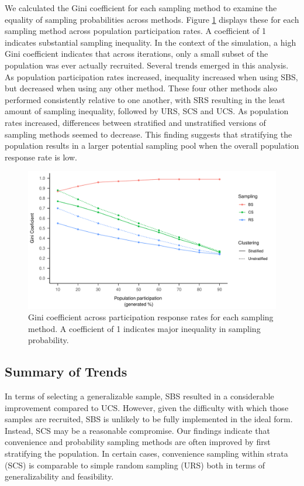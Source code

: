\documentclass[english,man,floatsintext]{apa6}
\begin{document}
We calculated the Gini coefficient for each sampling method to examine the equality of sampling probabilities across methods. Figure \ref{fig:fig-gini} displays these for each sampling method across population participation rates. A coefficient of 1 indicates substantial sampling inequality. In the context of the simulation, a high Gini coefficient indicates that across iterations, only a small subset of the population was ever actually recruited.
Several trends emerged in this analysis. As population participation rates increased, inequality increased when using SBS, but decreased when using any other method. These four other methods also performed consistently relative to one another, with SRS resulting in the least amount of sampling inequality, followed by URS, SCS and UCS. As population rates increased, differences between stratified and unstratified versions of sampling methods seemed to decrease. This finding suggests that stratifying the population results in a larger potential sampling pool when the overall population response rate is low.



\begin{figure}
\centering
\includegraphics{6---Paper_files/figure-latex/fig-gini-1.pdf}
\caption{\label{fig:fig-gini}Gini coefficient across participation response rates for each sampling method. A coefficient of 1 indicates major inequality in sampling probability.}
\end{figure}

\hypertarget{summary-of-trends}{%
\subsection{Summary of Trends}\label{summary-of-trends}}

In terms of selecting a generalizable sample, SBS resulted in a considerable improvement compared to UCS. However, given the difficulty with which those samples are recruited, SBS is unlikely to be fully implemented in the ideal form. Instead, SCS may be a reasonable compromise. Our findings indicate that convenience and probability sampling methods are often improved by first stratifying the population. In certain cases, convenience sampling within strata (SCS) is comparable to simple random sampling (URS) both in terms of generalizability and feasibility.
\end{document}
